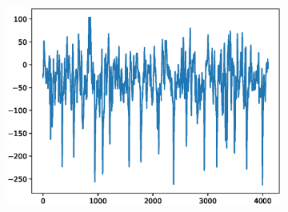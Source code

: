 \documentclass[12pt]{article}
\begin{document}
\begin{figure}
\begin{subfigure}{.25\textwidth}
\end{subfigure}%
\begin{subfigure}{.25\textwidth}
  \centering
  \includegraphics[width=.8\linewidth]{figures/signals/C/N058.eps}
\end{subfigure}


\end{figure}
\end{document}
